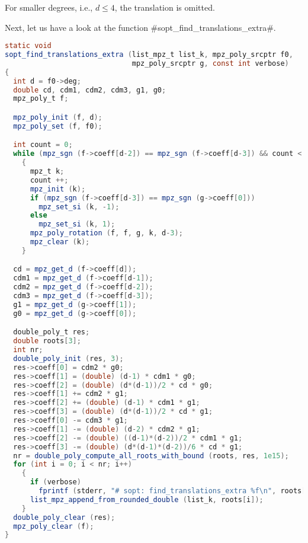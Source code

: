 \documentclass[a4paper]{article}
\begin{document}
For smaller degrees, i.e., $d\leq 4$, the translation is omitted.

Next, let us have a look at the function #sopt_find_translations_extra#.
\begin{lstlisting}[language=Java]
static void
sopt_find_translations_extra (list_mpz_t list_k, mpz_poly_srcptr f0,
                              mpz_poly_srcptr g, const int verbose)
{
  int d = f0->deg;
  double cd, cdm1, cdm2, cdm3, g1, g0;
  mpz_poly_t f;

  mpz_poly_init (f, d);
  mpz_poly_set (f, f0);

  int count = 0;
  while (mpz_sgn (f->coeff[d-2]) == mpz_sgn (f->coeff[d-3]) && count < 100)
    {
      mpz_t k;
      count ++;
      mpz_init (k);
      if (mpz_sgn (f->coeff[d-3]) == mpz_sgn (g->coeff[0]))
        mpz_set_si (k, -1);
      else
        mpz_set_si (k, 1);
      mpz_poly_rotation (f, f, g, k, d-3);
      mpz_clear (k);
    }

  cd = mpz_get_d (f->coeff[d]);
  cdm1 = mpz_get_d (f->coeff[d-1]);
  cdm2 = mpz_get_d (f->coeff[d-2]);
  cdm3 = mpz_get_d (f->coeff[d-3]);
  g1 = mpz_get_d (g->coeff[1]);
  g0 = mpz_get_d (g->coeff[0]);

  double_poly_t res;
  double roots[3];
  int nr;
  double_poly_init (res, 3);
  res->coeff[0] = cdm2 * g0;
  res->coeff[1] = (double) (d-1) * cdm1 * g0;
  res->coeff[2] = (double) (d*(d-1))/2 * cd * g0;
  res->coeff[1] += cdm2 * g1;
  res->coeff[2] += (double) (d-1) * cdm1 * g1;
  res->coeff[3] = (double) (d*(d-1))/2 * cd * g1;
  res->coeff[0] -= cdm3 * g1;
  res->coeff[1] -= (double) (d-2) * cdm2 * g1;
  res->coeff[2] -= (double) ((d-1)*(d-2))/2 * cdm1 * g1;
  res->coeff[3] -= (double) (d*(d-1)*(d-2))/6 * cd * g1;
  nr = double_poly_compute_all_roots_with_bound (roots, res, 1e15);
  for (int i = 0; i < nr; i++)
    {
      if (verbose)
        fprintf (stderr, "# sopt: find_translations_extra %f\n", roots[i]);
      list_mpz_append_from_rounded_double (list_k, roots[i]);
    }
  double_poly_clear (res);
  mpz_poly_clear (f);
}
\end{lstlisting}
\end{document}
